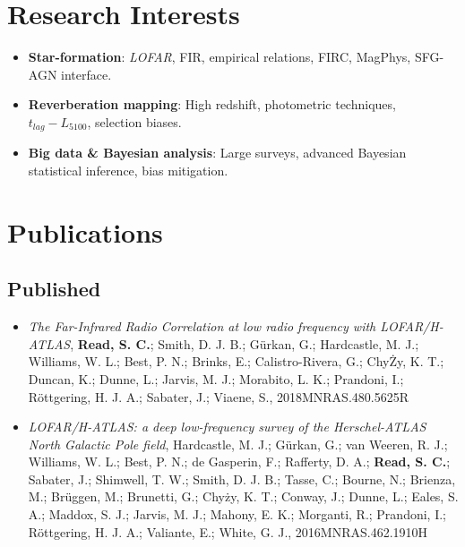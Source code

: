 \documentclass[letterpaper]{twentysecondcv} %
\begin{document}
\section{Research Interests}
\begin{itemize}
    \item \textbf{Star-formation}: \textit{LOFAR}, FIR, empirical relations, FIRC, MagPhys, SFG-AGN interface.
    \item \textbf{Reverberation mapping}: High redshift, photometric techniques, $t_{lag}-L_{5100}$, selection biases.
    \item \textbf{Big data \& Bayesian analysis}: Large surveys, advanced Bayesian statistical inference, bias mitigation.
\end{itemize}

\newpage
{}
\section{Publications}
\subsection{Published}
\begin{itemize}

\item \textit{The Far-Infrared Radio Correlation at low radio frequency with LOFAR/H-ATLAS}, \textbf{Read, S. C.}; Smith, D. J. B.; Gürkan, G.; Hardcastle, M. J.; Williams, W. L.; Best, P. N.; Brinks, E.; Calistro-Rivera, G.; ChyŻy, K. T.; Duncan, K.; Dunne, L.; Jarvis, M. J.; Morabito, L. K.; Prandoni, I.; Röttgering, H. J. A.; Sabater, J.; Viaene, S., 2018MNRAS.480.5625R


\item \textit{LOFAR/H-ATLAS: a deep low-frequency survey of the Herschel-ATLAS North Galactic Pole field}, Hardcastle, M. J.; Gürkan, G.; van Weeren, R. J.; Williams, W. L.; Best, P. N.; de Gasperin, F.; Rafferty, D. A.; \textbf{Read, S. C.}; Sabater, J.; Shimwell, T. W.; Smith, D. J. B.; Tasse, C.; Bourne, N.; Brienza, M.; Brüggen, M.; Brunetti, G.; Chyży, K. T.; Conway, J.; Dunne, L.; Eales, S. A.; Maddox, S. J.; Jarvis, M. J.; Mahony, E. K.; Morganti, R.; Prandoni, I.; Röttgering, H. J. A.; Valiante, E.; White, G. J., 2016MNRAS.462.1910H

\end{itemize}
\end{document}
